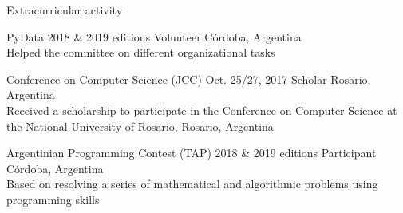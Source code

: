 \documentclass{curriculum}
\begin{document}

\begin{cvsection}{Extracurricular activity}

    \makesectionitemheader
        {PyData}                                            {2018 \& 2019 editions}
        {Volunteer}                                         {Córdoba, Argentina} \\
        \vspace{0.5ex}
        {Helped the committee on different organizational tasks}

    \makesectionitemheader
        {Conference on Computer Science (JCC)}              {Oct. 25/27, 2017}
        {Scholar}                                           {Rosario, Argentina} \\
        \vspace{0.5ex}
        {
            Received a scholarship to participate in the Conference on
            Computer Science at the National University of Rosario, Rosario, Argentina
        }

    \makesectionitemheader
        {Argentinian Programming Contest (TAP)}             {2018 \& 2019 editions}
        {Participant}                                       {Córdoba, Argentina} \\
        \vspace{0.5ex}
        {
            Based on resolving a series of mathematical and algorithmic
            problems using programming skills
        }

\end{cvsection}

\end{document}

